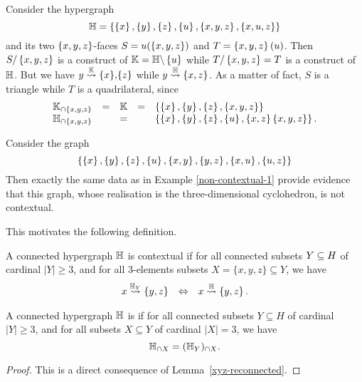 \begin{example} \label{non-contextual-1}
Consider the hypergraph 
$${\mathbb H}= \left\{\left\{x\right\},\left\{y\right\},\left\{z\right\},\left\{u\right\},\left\{x,y,z\right\}, \left\{x,u,z\right\}\right\}$$
and its two $\left\{x,y,z\right\}$-faces $S=u(\left\{x,y,z\right\})$ and $T=\left\{x,y,z\right\}(u)$. 
Then $S/\left\{x,y,z\right\}$ is a construct of
${\mathbb K}={\mathbb H}\backslash \left\{u\right\}$ while $T/\left\{x,y,z\right\}=T$ is a construct of ${\mathbb H}$.
But we have $y\stackrel{{\mathbb K}}{\rightsquigarrow}\left\{x\right\}\!,\!\left\{z\right\}$ while  $y\stackrel{{\mathbb H}}{\rightsquigarrow}\left\{x,z\right\}$. 
As a matter of fact,
$S$ is a triangle while $T$ is a quadrilateral, since
$$\begin{array}{lllll}
{\mathbb K}_{\cap \left\{x,y,z\right\}} &=& {\mathbb K} & = & \left\{\left\{x\right\},\left\{y\right\},\left\{z\right\},\left\{x,y,z\right\}\right\}\\
{\mathbb H}_{\cap \left\{x,y,z\right\}} && =&&  \left\{\left\{x\right\},\left\{y\right\},\left\{z\right\},\left\{u\right\},\left\{x,z\right\}\left\{x,y,z\right\}\right\}.
\end{array}$$
\end{example}
  
\begin{example} 
  \label{non-contextual-2}
Consider the graph 
$$\left\{\left\{x\right\},\left\{y\right\},\left\{z\right\},\left\{u\right\},\left\{x,y\right\}, \left\{y,z\right\}, \left\{x,u\right\}, \left\{u,z\right\}\right\}$$
Then exactly the same data as in Example \ref{non-contextual-1} provide evidence that this graph, whose realisation is the three-dimensional cyclohedron, is not contextual. 
\end{example}

This motivates the following definition.

\begin{definition} 
A connected hypergraph ${\mathbb H}$ is contextual if for all connected subsets $Y\subseteq H$ of cardinal $|Y|\geq 3$, and for all $3$-elements subsets $X=\{x,y,z\} \subseteq Y$, we have 
$$\begin{array}{lll}
  x\stackrel{{{\mathbb H}_Y}}{\rightsquigarrow}\left\{y,z\right\} & \Leftrightarrow & x\stackrel{{\mathbb H}}{\rightsquigarrow}\left\{y,z\right\}.
  \end{array}$$
\end{definition}

\begin{lemma} \label{context-lemma}
  A connected hypergraph ${\mathbb H}$ is  if for all connected subsets $Y \subseteq H$ of cardinal $|Y|\geq 3$, and for all subsets $X \subseteq Y$ of cardinal $|X|=3$, we have
  $${\mathbb H}_{\cap X} = ({\mathbb H}_Y)_{\cap X}.$$ 
\end{lemma}

\begin{proof} 
  This is a direct consequence of Lemma~\ref{xyz-reconnected}.
\end{proof}

